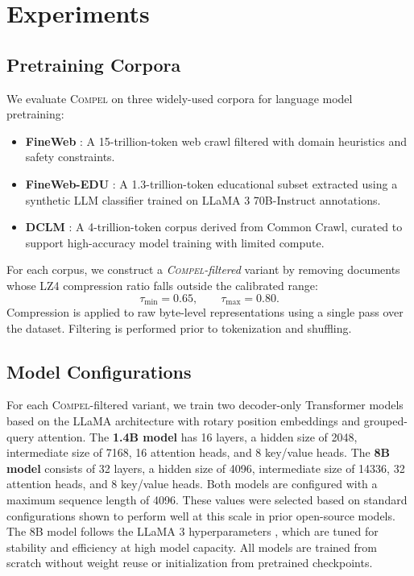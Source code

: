 \section{Experiments}\label{sec:experiments}

\subsection{Pretraining Corpora}\label{sec:corpora}

We evaluate \textsc{Compel} on three widely-used corpora for language model pretraining:
\begin{itemize}[leftmargin=1.35em,topsep=2pt,itemsep=1pt]
\item \textbf{FineWeb} \citep{penedo2024fineweb}: A 15-trillion-token web crawl filtered with domain heuristics and safety constraints.
\item \textbf{FineWeb-EDU} \citep{penedo2024fineweb}: A 1.3-trillion-token educational subset extracted using a synthetic LLM classifier trained on LLaMA 3 70B-Instruct annotations.
\item \textbf{DCLM} \citep{li2024datacomp}: A 4-trillion-token corpus derived from Common Crawl, curated to support high-accuracy model training with limited compute.
\end{itemize}

For each corpus, we construct a \emph{\textsc{Compel}-filtered} variant by removing documents whose LZ4 compression ratio falls outside the calibrated range:
\begin{equation*}
\tau_{\min} = 0.65, \qquad \tau_{\max} = 0.80.
\end{equation*}
Compression is applied to raw byte-level representations using a single pass over the dataset.
Filtering is performed prior to tokenization and shuffling.

\subsection{Model Configurations}\label{sec:models}

For each \textsc{Compel}-filtered variant, we train two decoder-only Transformer models based on the LLaMA architecture \citep{touvron2023llama} with rotary position embeddings and grouped-query attention.
The \textbf{1.4B model} has 16 layers, a hidden size of 2048, intermediate size of 7168, 16 attention heads, and 8 key/value heads.
The \textbf{8B model} consists of 32 layers, a hidden size of 4096, intermediate size of 14336, 32 attention heads, and 8 key/value heads.
Both models are configured with a maximum sequence length of 4096.
These values were selected based on standard configurations shown to perform well at this scale in prior open-source models.
The 8B model follows the LLaMA 3 hyperparameters \citep{touvron2023llama}, which are tuned for stability and efficiency at high model capacity.
All models are trained from scratch without weight reuse or initialization from pretrained checkpoints.

